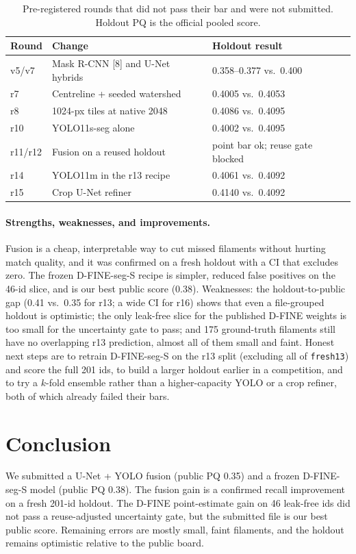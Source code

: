 \documentclass[sigconf,nonacm]{acmart}
\begin{document}
\begin{table}[t]
  \caption{Pre-registered rounds that did not pass their bar and were not submitted. Holdout PQ is the official pooled score.}
  \label{tab:neg}
  \centering
  \small
  \begin{tabular}{@{}l p{} p{}@{}}
    \toprule
    Round & Change & Holdout result \\
    \midrule
    v5/v7 & Mask R-CNN [8] and U-Net hybrids & 0.358--0.377 vs.\ 0.400 \\
    r7 & Centreline + seeded watershed & 0.4005 vs.\ 0.4053 \\
    r8 & 1024-px tiles at native 2048 & 0.4086 vs.\ 0.4095 \\
    r10 & YOLO11s-seg alone & 0.4002 vs.\ 0.4095 \\
    r11/r12 & Fusion on a reused holdout & point bar ok; reuse gate blocked \\
    r14 & YOLO11m in the r13 recipe & 0.4061 vs.\ 0.4092 \\
    r15 & Crop U-Net refiner & 0.4140 vs.\ 0.4092 \\
    \bottomrule
  \end{tabular}
\end{table}

\paragraph{Strengths, weaknesses, and improvements.}
Fusion is a cheap, interpretable way to cut missed filaments without hurting match quality, and it was confirmed on a fresh holdout with a CI that excludes zero. The frozen D-FINE-seg-S recipe is simpler, reduced false positives on the 46-id slice, and is our best public score (0.38). Weaknesses: the holdout-to-public gap (0.41 vs.\ 0.35 for r13; a wide CI for r16) shows that even a file-grouped holdout is optimistic; the only leak-free slice for the published D-FINE weights is too small for the uncertainty gate to pass; and 175 ground-truth filaments still have no overlapping r13 prediction, almost all of them small and faint. Honest next steps are to retrain D-FINE-seg-S on the r13 split (excluding all of \texttt{fresh13}) and score the full 201 ids, to build a larger holdout earlier in a competition, and to try a $k$-fold ensemble rather than a higher-capacity YOLO or a crop refiner, both of which already failed their bars.

\section*{Conclusion}
We submitted a U-Net + YOLO fusion (public PQ 0.35) and a frozen D-FINE-seg-S model (public PQ 0.38). The fusion gain is a confirmed recall improvement on a fresh 201-id holdout. The D-FINE point-estimate gain on 46 leak-free ids did not pass a reuse-adjusted uncertainty gate, but the submitted file is our best public score. Remaining errors are mostly small, faint filaments, and the holdout remains optimistic relative to the public board.
\end{document}
